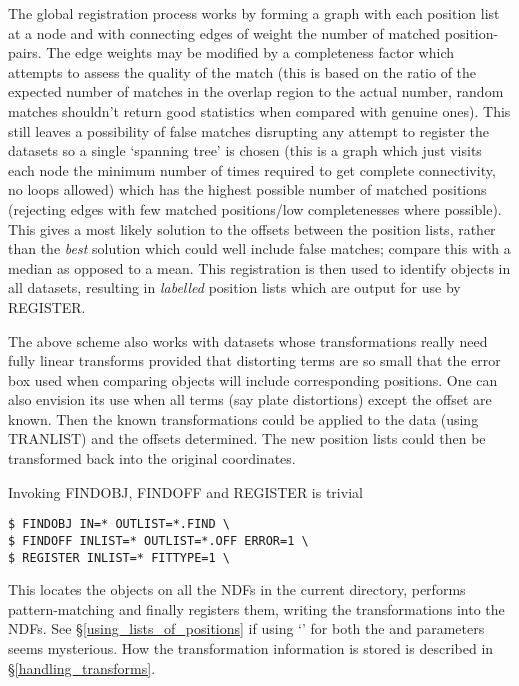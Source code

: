 The global registration process works by forming a graph with each
position list at a node and with connecting edges of weight the number
of matched  position-pairs. The edge weights may be modified by a
completeness factor which attempts to assess the quality of the match
(this is based on the ratio of the expected number of matches in the
overlap region to the actual number, random matches shouldn't return
good statistics when compared with genuine ones). This still leaves a
possibility of false matches disrupting any attempt to register the
datasets so a single `spanning tree' is chosen (this is a graph which
just visits each node the minimum number of times required to get
complete connectivity, no loops allowed) which has the highest possible
number of matched positions (rejecting edges with few matched
positions/low completenesses where possible). This gives a most likely
solution to the offsets between the position lists, rather than the 
{\em best} solution which could well include false matches; compare this
with a median as opposed to a mean. This registration is then used to
identify objects in all datasets, resulting in {\em labelled} position
lists which are output for use by REGISTER.

The above scheme also works with datasets whose transformations really
need fully linear transforms provided that distorting terms are so small
that the error box used when comparing objects will include
corresponding positions. One can also envision its use when all terms
(say plate distortions) except the offset are known. Then the known
transformations could be applied to the data (using TRANLIST) and the
offsets determined. The new position lists could then be transformed
back into the original coordinates.

Invoking FINDOBJ, FINDOFF and REGISTER is trivial
\begin{myquote}
\begin{verbatim}
$ FINDOBJ IN=* OUTLIST=*.FIND \
$ FINDOFF INLIST=* OUTLIST=*.OFF ERROR=1 \
$ REGISTER INLIST=* FITTYPE=1 \
\end{verbatim}
\end{myquote}

This locates the objects on all the NDFs in the current directory,
performs pattern-matching and finally registers them, writing the
transformations into the NDFs. See \S\ref{using_lists_of_positions} if
using `\myverb{*}' for both the  \myverb{IN} and \myverb{INLIST}
parameters seems mysterious. How the transformation information is
stored is described in \S\ref{handling_transforms}.

